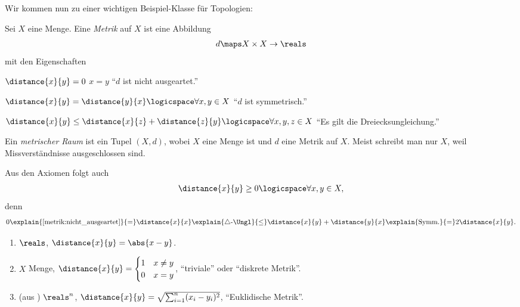 Wir kommen nun zu einer wichtigen Beispiel-Klasse für Topologien:
\begin{definition}
    Sei \( X \) eine Menge. Eine \emph{Metrik} auf \( X \) ist eine Abbildung
    \begin{align*}
        d\maps X\times X \to \reals
    \end{align*}
    mit den Eigenschaften
    \begin{eigenschaftenenumerate}
        \item \label{metrik:nicht_ausgeartet}\( \distance{x}{y}=0 \) \tiff \( x=y \) \enquote{\( d \) ist nicht ausgeartet.}
        \item \label{metrik:symmetrisch}\( \distance{x}{y}=\distance{y}{x}\logicspace\forall x,y \in X \) \enquote{\( d \) ist symmetrisch.}
        \item \label{metrik:dreiecksungleichung} \( \distance{x}{y}\leq \distance{x}{z}+\distance{z}{y} \logicspace\forall x,y,z\in X\) \enquote{Es gilt die Dreiecksungleichung.} 
    \end{eigenschaftenenumerate}
    Ein \emph{metrischer Raum} ist ein Tupel \( (X,d) \), wobei \( X \) eine Menge ist und \( d \) eine Metrik auf \( X \). Meist schreibt man nur \( X \), weil Missverständnisse ausgeschlossen sind.
\end{definition}
\begin{bemerkung*}
    Aus den Axiomen folgt auch
    \begin{align*}
        \distance{x}{y}\geq 0 \logicspace \forall x,y \in X,
    \end{align*}
    denn
    \begin{align*}
        0\explain{\ref{metrik:nicht_ausgeartet}}{=}\distance{x}{x}\explain{\triangle\text{-\Ungl}}{\leq}\distance{x}{y}+\distance{y}{x}\explain{\text{Symm.}}{=}2\distance{x}{y}.
    \end{align*}
\end{bemerkung*}
\begin{beispiele*}
    \begin{enumerate}[label=\rechtsklammer{\roman*}, ref=\rechtsklammer{\roman*}]
        \item \label{metrik:beispiele:r}\( \reals \), \( \distance{x}{y}=\abs{x-y} \).
        \item \label{metrik:beispiele:diskret}\( X \) Menge, \( \distance{x}{y}=\begin{cases}
            1 & x\neq y\\
            0 & x=y
        \end{cases}
         \), \enquote{triviale} oder \enquote{diskrete Metrik}.
         
         \item\label{metrik:beispiele:r_n} (aus ) \( \reals^n \), \( \distance{x}{y}=\sqrt{\sum_{i=1}^{n} (x_i-y_i)^2} \), \enquote{Euklidische Metrik}.
    \end{enumerate}
\end{beispiele*}
